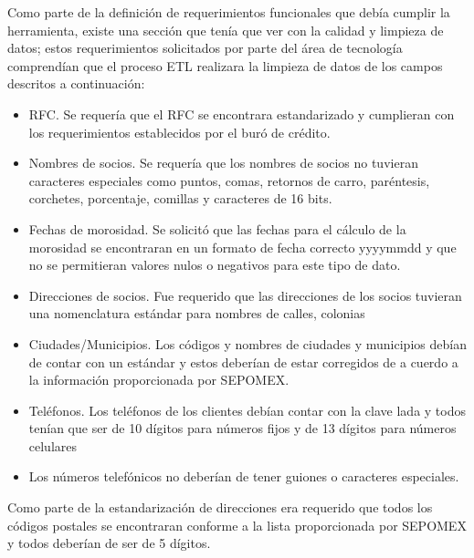 Como parte de la definición de requerimientos funcionales que debía cumplir la
herramienta, existe una sección que tenía que ver con la calidad y limpieza de
datos; estos requerimientos solicitados por parte del área de tecnología
comprendían que el proceso ETL realizara la limpieza de datos de los campos
descritos a continuación:

\begin{itemize}

\item RFC. Se requería que el RFC se encontrara estandarizado y cumplieran con
  los requerimientos establecidos por el buró de crédito.

\item Nombres de socios. Se requería que los nombres de socios no tuvieran
  caracteres especiales como puntos, comas, retornos de carro, paréntesis,
  corchetes, porcentaje, comillas y caracteres de 16 bits.

\item Fechas de morosidad. Se solicitó que las fechas para el cálculo de la
  morosidad se encontraran en un formato de fecha correcto yyyymmdd y que no se
  permitieran valores nulos o negativos para este tipo de dato.

\item Direcciones de socios. Fue requerido que las direcciones de los socios
  tuvieran una nomenclatura estándar para nombres de calles, colonias

\item Ciudades/Municipios. Los códigos y nombres de ciudades y municipios debían
  de contar con un estándar y estos deberían de estar corregidos de a cuerdo a
  la información proporcionada por SEPOMEX.

\item Teléfonos. Los teléfonos de los clientes debían contar con la clave lada y
  todos tenían que ser de 10 dígitos para números fijos y de 13 dígitos para
  números celulares

\item Los números telefónicos no deberían de tener guiones o caracteres
  especiales.

\end{itemize}

Como parte de la estandarización de direcciones era requerido que todos los
códigos postales se encontraran conforme a la lista proporcionada por SEPOMEX y
todos deberían de ser de 5 dígitos.

\cleardoublepage

